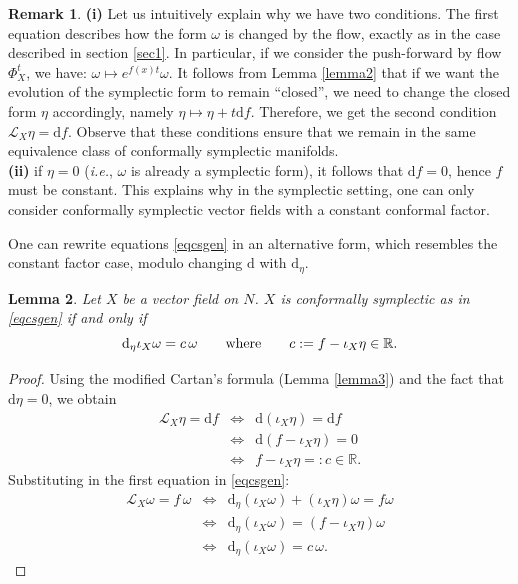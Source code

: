 \documentclass[11pt]{article}
\newtheorem{lemma}{Lemma}
\theoremstyle{definition}
\newtheorem{remark}[lemma]{Remark}
\def\d{\mathrm{d}}
\begin{document}
\begin{remark}
{\bf (i)} Let us intuitively explain why we have two conditions. The first equation describes how the form $\omega$ is changed by the flow, exactly as in the case described in section \ref{sec1}. In particular, if we consider the push-forward by flow $\Phi_X^t$, we have: 
$
\omega \longmapsto e^{f(x)t} \omega. 
$
It follows from Lemma \ref{lemma2} that if we want the evolution of the symplectic form to remain ``closed'', we need to change the closed form $\eta$ accordingly, namely
 $\eta \longmapsto \eta+ t \d f$. Therefore, we get the second condition $ {\mathcal L}_X\eta = \d f$. Observe that these conditions ensure that we remain in the same equivalence class of conformally symplectic manifolds. \\
{\bf (ii)} if $\eta=0$ ({\it i.e.}, $\omega$ is already a symplectic form), it follows that $\d f=0$, hence $f$ must be constant. This explains why in the symplectic setting, one can only consider conformally symplectic vector fields with a constant conformal factor.\\
\end{remark}


\medskip

One can rewrite equations \eqref{eqcsgen} in an alternative form, which resembles the constant factor case, modulo changing $\d$ with $\d_\eta$.\\

\begin{lemma}
Let $X$ be a vector field on $N$. $X$ is conformally symplectic as in \eqref{eqcsgen} if and only if
  \begin{equation} \label{condcs}
  \d_\eta \iota_X\omega = c\,\omega \qquad {\rm where}\qquad c:= f- \iota_X\eta \in{\mathbb R}.
  \end{equation}
\end{lemma}

\medskip

\begin{proof}
  Using the modified Cartan's formula (Lemma \ref{lemma3}) and the fact that $\d\eta=0$, we obtain
  \begin{eqnarray*}
    {\mathcal L}_X\eta = \d f &\Longleftrightarrow& \d (\iota_X\eta) = \d f \\
    &\Longleftrightarrow& \d(f-\iota_X\eta) =0 \\
    &\Longleftrightarrow& f- \iota_X\eta =:c \in{\mathbb R}.
  \end{eqnarray*}
  Substituting in the first equation in \eqref{eqcsgen}:
  \begin{eqnarray*}
    {\mathcal L}_X\omega = f\, \omega &\Longleftrightarrow&
     \d_\eta (\iota_X\omega) + (\iota_X\eta)\omega = f\omega \\
    &\Longleftrightarrow& \d_\eta (\iota_X\omega) = (f- \iota_X\eta)\omega\\
    &\Longleftrightarrow& \d_\eta (\iota_X\omega) = c\,\omega.
  \end{eqnarray*}
\end{proof}
\end{document}
